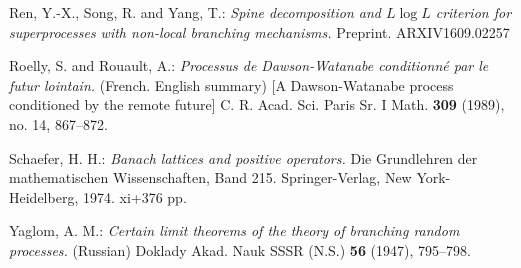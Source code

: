 \documentclass[12pt,a4paper]{amsart}
\numberwithin{equation}{section}
\theoremstyle{plain}
\theoremstyle{definition}
\theoremstyle{remark}
\begin{document}
\begin{thebibliography}{99}
Ren, Y.-X., Song, R. and Yang, T.:
\emph{Spine decomposition and {$ L\log L $} criterion for superprocesses with non-local branching mechanisms.}
Preprint.
ARXIV{1609.02257}

Roelly, S. and Rouault, A.:
\emph{Processus de Dawson-Watanabe conditionn\'e par le futur lointain.} (French. English summary) [A Dawson-Watanabe process conditioned by the remote future]
C. R. Acad. Sci. Paris Sr. I Math. \textbf{309} (1989), no. 14, 867--872.

Schaefer, H. H.:
\emph{Banach lattices and positive operators.}
Die Grundlehren der mathematischen Wissenschaften, Band 215. Springer-Verlag, New York-Heidelberg, 1974. xi+376 pp. 

Yaglom, A. M.:
\emph{Certain limit theorems of the theory of branching random processes.} (Russian)
Doklady Akad. Nauk SSSR (N.S.) \textbf{56} (1947), 795--798.

\end{thebibliography}
\end{document}
